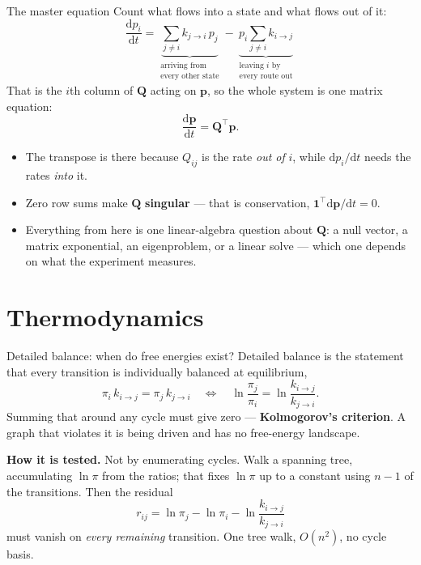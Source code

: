 \documentclass[10pt,aspectratio=169]{beamer}
\newcommand{\Q}{\bm{Q}}
\begin{document}
\begin{frame}{The master equation}
  Count what flows into a state and what flows out of it:
  \vspace{-0.4em}
  \[
    \frac{\mathrm{d}p_i}{\mathrm{d}t}
      = \underbrace{\sum_{j\neq i} k_{j\to i}\,p_j}_{
        \substack{\text{arriving from}\\ \text{every other state}}}
      - \underbrace{p_i\sum_{j\neq i} k_{i\to j}}_{
        \substack{\text{leaving }i\text{ by}\\ \text{every route out}}}
  \]
  That is the $i$th column of $\Q$ acting on $\bm{p}$, so the whole system
  is one matrix equation:
  \[
    \frac{\mathrm{d}\bm{p}}{\mathrm{d}t} = \Q^{\!\top}\bm{p} .
  \]
  \begin{itemize}
    \item The transpose is there because $Q_{ij}$ is the rate \emph{out of}
      $i$, while $\mathrm{d}p_i/\mathrm{d}t$ needs the rates \emph{into} it.
    \item Zero row sums make $\Q$ \textbf{singular} --- that is
      conservation, $\bm{1}^{\!\top}\mathrm{d}\bm{p}/\mathrm{d}t=0$.
    \item Everything from here is one linear-algebra question about $\Q$:
      a null vector, a matrix exponential, an eigenproblem, or a linear
      solve --- which one depends on what the experiment measures.
  \end{itemize}
\end{frame}

\section[Thermodynamics]{Thermodynamics}

\begin{frame}{Detailed balance: when do free energies exist?}
  Detailed balance is the statement that every transition is individually
  balanced at equilibrium,
  \[
    \pi_i\,k_{i\to j} = \pi_j\,k_{j\to i}
    \quad\Longleftrightarrow\quad
    \ln\frac{\pi_j}{\pi_i} = \ln\frac{k_{i\to j}}{k_{j\to i}} .
  \]
  Summing that around any cycle must give zero --- \textbf{Kolmogorov's
  criterion}. A graph that violates it is being driven and has no
  free-energy landscape.

  \textbf{How it is tested.} Not by enumerating cycles. Walk a spanning
  tree, accumulating $\ln\pi$ from the ratios; that fixes $\ln\pi$ up to a
  constant using $n-1$ of the transitions. Then the residual
  \[
    r_{ij} = \ln\pi_j - \ln\pi_i - \ln\frac{k_{i\to j}}{k_{j\to i}}
  \]
  must vanish on \emph{every remaining} transition. One tree walk,
  $O(n^2)$, no cycle basis.
\end{frame}
\end{document}
